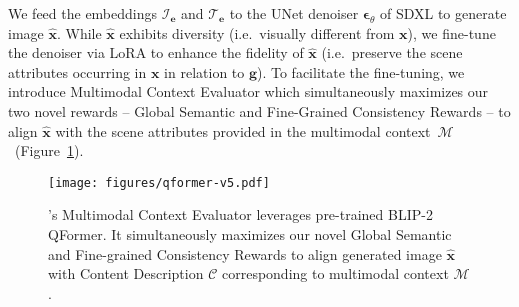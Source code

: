 We feed the embeddings $\mathcal{I}_\mathbf{e}$ and $\mathcal{T}_\mathbf{e}$ to the UNet denoiser $\boldsymbol{\epsilon}_\theta$ of SDXL \citep{podell2023sdxl} to generate image $\mathbf{\hat{x}}$. While $\mathbf{\hat{x}}$ exhibits diversity (i.e.~visually different from $\mathbf{x}$), we fine-tune the denoiser via LoRA \citep{hu2021lora} to enhance the fidelity of $\mathbf{\hat{x}}$ (i.e.~preserve the scene attributes occurring in $\mathbf{x}$ in relation to $\mathbf{g}$). To facilitate the fine-tuning, we introduce Multimodal Context Evaluator which simultaneously maximizes our two novel rewards -- Global Semantic and Fine-Grained Consistency Rewards -- to align $\mathbf{\hat{x}}$ with the scene attributes provided in the multimodal context~$\mathcal{M}$~(Figure~\ref{fig:qformer}). 






\begin{figure}[!t]
    \centering
    \texttt{[image: figures/qformer-v5.pdf]}
    \vspace{-4mm}
    \caption{\method's Multimodal Context Evaluator leverages pre-trained BLIP-2 QFormer. It simultaneously maximizes our novel Global Semantic and Fine-grained Consistency Rewards to align generated image $\mathbf{\hat{x}}$ with Content Description $\mathcal{C}$ corresponding to multimodal context $\mathcal{M}$.}
    \label{fig:qformer}
    \vspace{-5mm}
\end{figure}
\vspace{-1mm}
